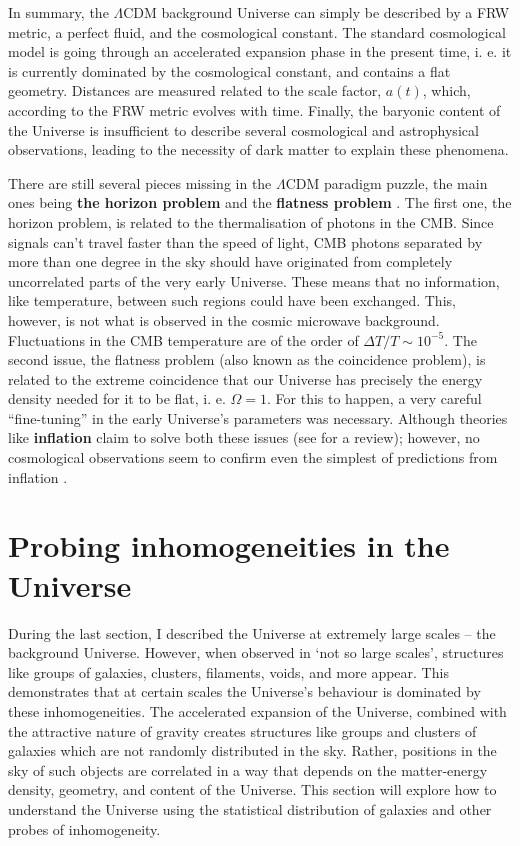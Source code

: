 \qquad In summary, the $\Lambda$CDM background Universe can simply be described by a FRW metric, a perfect fluid, and the cosmological constant. The standard cosmological model is going through an accelerated expansion phase in the present time, i. e. it is currently dominated by the cosmological constant, and contains a flat geometry. Distances are measured related to the scale factor, $a(t)$, which, according to the FRW metric evolves with time. Finally, the baryonic content of the Universe is insufficient to describe several cosmological and astrophysical observations, leading to the necessity of dark matter to explain these phenomena. 

\qquad There are still several pieces missing in the $\Lambda$CDM paradigm puzzle, the main ones being \textbf{the horizon problem} and the \textbf{flatness problem} \citep{schneider_2016}. The first one, the horizon problem, is related to the thermalisation of photons in the CMB. Since signals can't travel faster than the speed of light, CMB photons separated by more than one degree in the sky should have originated from completely uncorrelated parts of the very early Universe. These means that no information, like temperature, between such regions could have been exchanged. This, however, is not what is observed in the cosmic microwave background. Fluctuations in the CMB temperature are of the order of $\Delta T/T \sim 10^{-5}$. The second issue, the flatness problem (also known as the coincidence problem), is related to the extreme coincidence that our Universe has precisely the energy density needed for it to be flat, i. e. $\Omega = 1$. For this to happen, a very careful ``fine-tuning'' in the early Universe's parameters was necessary. Although theories like \textbf{inflation} claim to solve both these issues (see \citealt{2008InflationReview} for a review); however, no cosmological observations seem to confirm even the simplest of predictions from inflation \citep{2014Bicep2Planck}.

\vspace{10mm}
\section{Probing inhomogeneities in the Universe}
During the last section, I described the Universe at extremely large scales -- the background Universe. However, when observed in `not so large scales', structures like groups of galaxies, clusters, filaments, voids, and more appear. This demonstrates that at certain scales the Universe's behaviour is dominated by these inhomogeneities. The accelerated expansion of the Universe, combined with the attractive nature of gravity creates structures like groups and clusters of galaxies which are not randomly distributed in the sky. Rather, positions in the sky of such objects are correlated in a way that depends on the matter-energy density, geometry, and content of the Universe. This section will explore how to understand the Universe using the statistical distribution of galaxies and other probes of inhomogeneity.

